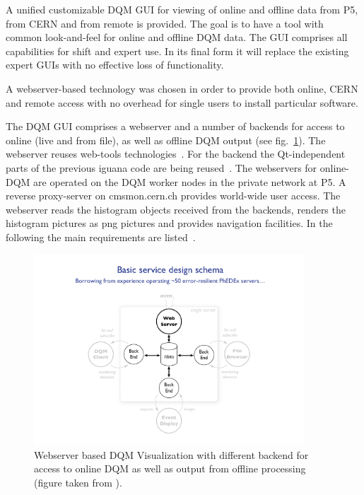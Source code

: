 
A unified customizable DQM GUI for viewing of online and offline data from P5, from CERN and from remote is provided. The goal is to have a tool with common look-and-feel for online and offline DQM data. The GUI comprises all capabilities for shift and expert use. In its final form it will replace the existing expert GUIs with no effective loss of functionality.

A webserver-based technology was chosen in order to provide both online, CERN and remote access with no overhead for single users to install particular software.

The DQM GUI comprises a webserver and a number of backends for access to online (live and from file), as well as offline DQM output (see fig.~\ref{fig:gui}). The webserver reuses web-tools technologies~\cite{webtools}. For the backend the Qt-independent parts of the previous iguana code are being reused~\cite{iguana}. The webservers for online-DQM are operated on the DQM worker nodes in the private network at P5. A reverse proxy-server on cmsmon.cern.ch provides world-wide user access. The webserver reads the histogram objects received from the backends, renders the histogram pictures as png pictures and provides navigation facilities. In the following the main requirements are listed~\cite{guimeeting,talk:lassi}.

\begin{figure}[!htbp]
\begin{center}
\includegraphics[width=0.9\textwidth]{GUI}
\caption{Webserver based DQM Visualization with different backend
for access to online DQM as well as output from offline processing
(figure taken from \cite{talk:lassi}). }
\end{center}
\label{fig:gui}
\end{figure}

